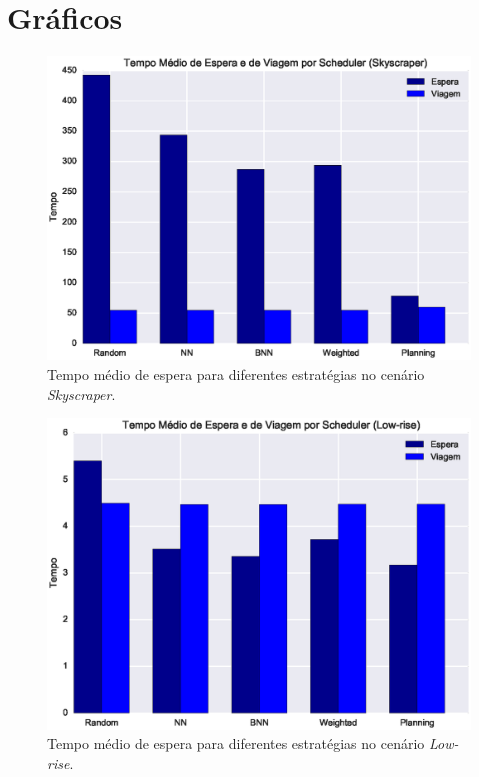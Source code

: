 \section{Gráficos}

\begin{figure}[htb]
  \centering
  \includegraphics[scale=0.5]{img/skyscraper-average-times-chart}
  \caption[{Tempo médio de espera no cenário \textit{Skyscraper}.}]{Tempo médio de espera para diferentes estratégias no cenário \textit{Skyscraper}.}
  \label{fig:result:average:skyscraper}
\end{figure}

\begin{figure}[htb]
  \centering
  \includegraphics[scale=0.5]{img/low-rise-average-times-chart}
  \caption[Tempo médio de espera no cenário \textit{Low-rise}.]{Tempo médio de espera para diferentes estratégias no cenário \textit{Low-rise}.}
  \label{fig:result:average:low-rise}
\end{figure}

